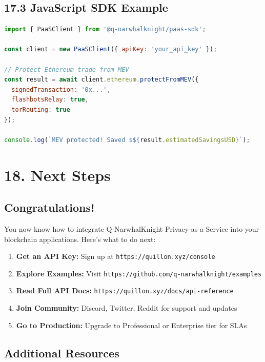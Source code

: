 \documentclass[11pt,a4paper]{article}
\begin{document}
\subsection{17.3 JavaScript SDK Example}

\begin{lstlisting}[language=javascript]
import { PaaSClient } from '@q-narwhalknight/paas-sdk';

const client = new PaaSClient({ apiKey: 'your_api_key' });

// Protect Ethereum trade from MEV
const result = await client.ethereum.protectFromMEV({
  signedTransaction: '0x...',
  flashbotsRelay: true,
  torRouting: true
});

console.log(`MEV protected! Saved $${result.estimatedSavingsUSD}`);
\end{lstlisting}

\section{18. Next Steps}

\subsection{Congratulations!}

You now know how to integrate Q-NarwhalKnight Privacy-as-a-Service into your blockchain applications. Here's what to do next:

\begin{enumerate}
    \item \textbf{Get an API Key:} Sign up at \texttt{https://quillon.xyz/console}

    \item \textbf{Explore Examples:} Visit \texttt{https://github.com/q-narwhalknight/examples}

    \item \textbf{Read Full API Docs:} \texttt{https://quillon.xyz/docs/api-reference}

    \item \textbf{Join Community:} Discord, Twitter, Reddit for support and updates

    \item \textbf{Go to Production:} Upgrade to Professional or Enterprise tier for SLAs
\end{enumerate}

\subsection{Additional Resources}
\end{document}
